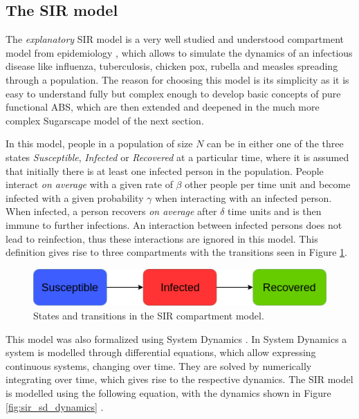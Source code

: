 \subsection{The SIR model}
\label{sec:sir_model}

The \textit{explanatory} SIR model is a very well studied and understood compartment model from epidemiology \cite{kermack_contribution_1927}, which allows to simulate the dynamics of an infectious disease like influenza, tuberculosis, chicken pox, rubella and measles spreading through a population. The reason for choosing this model is its simplicity as it is easy to understand fully but complex enough to develop basic concepts of pure functional ABS, which are then extended and deepened in the much more complex Sugarscape model of the next section.

In this model, people in a population of size $N$ can be in either one of the three states \textit{Susceptible}, \textit{Infected} or \textit{Recovered} at a particular time, where it is assumed that initially there is at least one infected person in the population. People interact \textit{on average} with a given rate of $\beta$ other people per time unit and become infected with a given probability $\gamma$ when interacting with an infected person. When infected, a person recovers \textit{on average} after $\delta$ time units and is then immune to further infections. An interaction between infected persons does not lead to reinfection, thus these interactions are ignored in this model. This definition gives rise to three compartments with the transitions seen in Figure \ref{fig:sir_transitions}.

\begin{figure}
	\centering
	\includegraphics[width=.7\textwidth, angle=0]{./fig/timedriven/SIR_transitions.png}
	\caption{States and transitions in the SIR compartment model.}
	\label{fig:sir_transitions}
\end{figure}

This model was also formalized using System Dynamics \cite{porter_industrial_1962}. In System Dynamics a system is modelled through differential equations, which allow expressing continuous systems, changing over time. They are solved by numerically integrating over time, which gives rise to the respective dynamics. The SIR model is modelled using the following equation, with the dynamics shown in Figure \ref{fig:sir_sd_dynamics} .

